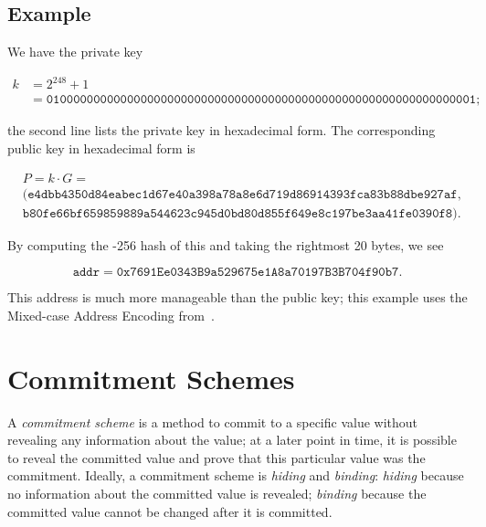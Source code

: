 \subsection{Example}

\begin{example}

We have the private key

\begin{align}
    k &= 2^{248} + 1 \nonumber\\
&= \texttt{0100000000000000000000000000000000000000000000000000000000000001};
\end{align}

\noindent
the second line lists the private key in hexadecimal form.
The corresponding public key in hexadecimal form is

\begin{align}
    &P = k\cdot G = \nonumber\\
    &(\texttt{e4dbb4350d84eabec1d67e40a398a78a8e6d719d86914393fca83b88dbe927af},
        \nonumber\\
    &\texttt{b80fe66bf659859889a544623c945d0bd80d855f649e8c197be3aa41fe0390f8}).
\end{align}

\noindent
By computing the \Keccak{}-256 hash of this and taking the rightmost
20 bytes, we see

\begin{equation}
    \texttt{addr} = \texttt{0x7691Ee0343B9a529675e1A8a70197B3B704f90b7}.
\end{equation}

\noindent
This address is much more manageable than the public key;
this example uses the Mixed-case Address Encoding from~\cite{ERC-55}.
\end{example}



\section{Commitment Schemes}

A \emph{commitment scheme} is a method to commit to a specific value
without revealing any information about the value;
at a later point in time, it is possible to reveal the committed
value and prove that this particular value was the commitment.
Ideally, a commitment scheme is \emph{hiding} and \emph{binding}:
\emph{hiding} because no information about the committed value is revealed;
\emph{binding} because the committed value cannot be changed after
it is committed.

